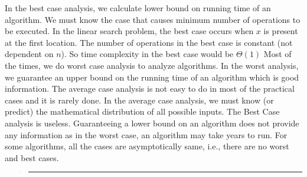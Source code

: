 \documentclass[10pt,english]{article}
\begin{document}
In the best case analysis, we calculate lower bound on running time
of an algorithm. We must know the case that causes minimum number
of operations to be executed. In the linear search problem, the best
case occurs when $x$ is present at the first location. The number
of operations in the best case is constant (not dependent on $n$).
So time complexity in the best case would be $\Theta (1)$ Most of
the times, we do worst case analysis to analyze algorithms. In the
worst analysis, we guarantee an upper bound on the running time of
an algorithm which is good information. The average case analysis
is not easy to do in most of the practical cases and it is rarely
done. In the average case analysis, we must know (or predict) the
mathematical distribution of all possible inputs. The Best Case analysis
is useless. Guaranteeing a lower bound on an algorithm does not provide
any information as in the worst case, an algorithm may take years
to run. For some algorithms, all the cases are asymptotically same,
i.e., there are no worst and best cases.
\begin{verse}
\rule[0.5ex]{1\columnwidth}{1pt}
\end{verse}
\end{document}
